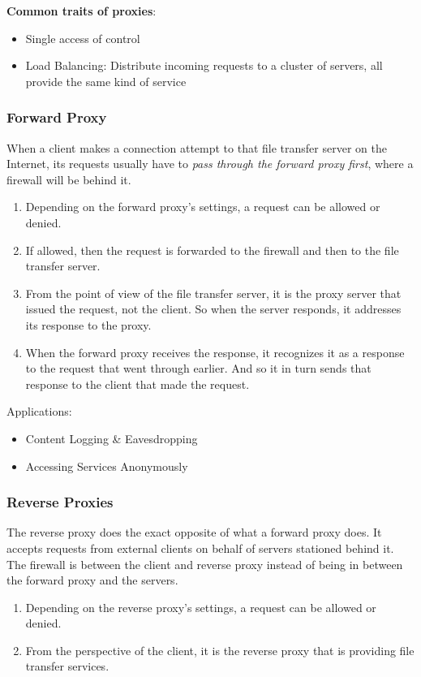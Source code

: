\documentclass[a4paper]{article}
\begin{document}
\noindent\textbf{Common traits of proxies}:
\begin{itemize}
    \item Single access of control
    \item Load Balancing: Distribute incoming requests to a cluster of servers, all provide the same kind of service
\end{itemize}

\subsubsection{Forward Proxy}
When a client makes a connection attempt to that file transfer server on the Internet, its requests usually have to \textit{pass through the forward proxy first}, where a firewall will be behind it.
\begin{enumerate}
    \item Depending on the forward proxy's settings, a request can be allowed or denied.
    \item If allowed, then the request is forwarded to the firewall and then to the file transfer server.
    \item From the point of view of the file transfer server, it is the proxy server that issued the request, not the client. So when the server responds, it addresses its response to the proxy.
    \item When the forward proxy receives the response, it recognizes it as a response to the request that went through earlier. And so it in turn sends that response to the client that made the request.
\end{enumerate}

\noindent Applications:
\begin{itemize}
    \item Content Logging \& Eavesdropping
    \item Accessing Services Anonymously
\end{itemize}

\subsubsection{Reverse Proxies}
The reverse proxy does the exact opposite of what a forward proxy does. It accepts requests from external clients on behalf of servers stationed behind it. The firewall is between the client and reverse proxy instead of being in between the forward proxy and the servers.

\begin{enumerate}
    \item Depending on the reverse proxy's settings, a request can be allowed or denied.
    \item From the perspective of the client, it is the reverse proxy that is providing file transfer services.
\end{enumerate}
\end{document}
